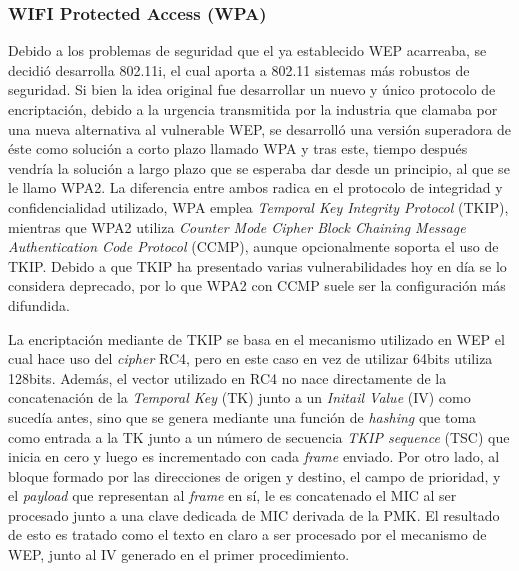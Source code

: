 \documentclass[10pt,a4paper]{article}
\begin{document}
\subsubsection{WIFI Protected Access (WPA)}
Debido a los problemas de seguridad que el ya establecido WEP acarreaba, se decidió desarrolla 802.11i, el cual aporta a 802.11 sistemas más robustos de seguridad. Si bien la idea original fue desarrollar un nuevo y único protocolo de encriptación, debido a la urgencia transmitida por la industria que clamaba por una nueva alternativa al vulnerable WEP, se desarrolló una versión superadora de éste como solución a corto plazo llamado WPA y tras este, tiempo después vendría la solución a largo plazo que se esperaba dar desde un principio, al que se le llamo WPA2. La diferencia entre ambos radica en el protocolo de integridad y confidencialidad utilizado, WPA emplea \textit{Temporal Key Integrity Protocol} (TKIP), mientras que WPA2 utiliza \textit{Counter Mode Cipher Block Chaining Message Authentication Code Protocol} (CCMP), aunque opcionalmente soporta el uso de TKIP. Debido a que TKIP ha presentado varias vulnerabilidades hoy en día se lo considera deprecado, por lo que WPA2 con CCMP suele ser la configuración más difundida.

La encriptación mediante de TKIP se basa en el mecanismo utilizado en WEP el cual hace uso del \textit{cipher} RC4, pero en este caso en vez de utilizar 64bits utiliza 128bits. Además, el vector utilizado en RC4 no nace directamente de la concatenación de la \textit{Temporal Key} (TK) junto a un \textit{Initail Value} (IV) como sucedía antes, sino que se genera mediante una función de \textit{hashing} que toma como entrada a la TK junto a un número de secuencia \textit{TKIP sequence} (TSC) que inicia en cero y luego es incrementado con cada \textit{frame} enviado. Por otro lado, al bloque formado por las direcciones de origen y destino, el campo de prioridad, y el \textit{payload} que representan al \textit{frame} en sí, le es concatenado el MIC al ser procesado junto a una clave dedicada de MIC derivada de la PMK. El resultado de esto es tratado como el texto en claro a ser procesado por el mecanismo de WEP, junto al IV generado en el primer procedimiento.
\end{document}
